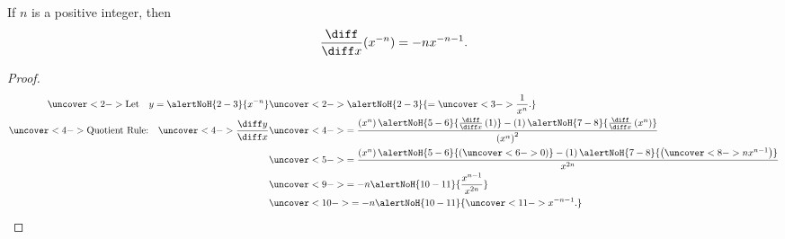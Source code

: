 \begin{frame}[t]
\begin{theorem}
If $n$ is a positive integer, then %
\[
\frac{\diff}{\diff x}(x^{-n}) = -nx^{-n-1}.
\]
\end{theorem}
\begin{proof}
\abovedisplayskip=0pt
\belowdisplayskip=-15pt
\abovedisplayshortskip=0pt
\belowdisplayshortskip=0pt
\begin{align*}
\uncover<2->{%
\text{Let}\quad y = \alertNoH{ 2-3}{x^{-n}} %
}%
& \uncover<2->{\alertNoH{ 2-3}{ = \uncover<3->{\frac{1}{x^n}.}}%
}\\%
\uncover<4->{%
\text{Quotient Rule:}\quad%
}%
\uncover<4->{%
\frac{\diff y}{\diff x}%
}%
& \uncover<4->{%
 = \frac%
{\left( x^{n} \right) \alertNoH{ 5-6}{\frac{\diff}{\diff x}\left( 1 \right)} - \left( 1 \right) \alertNoH{ 7-8}{\frac{\diff}{\diff x}\left( x^n \right)}}%
{\left( x^n\right)^2}%
}\\%
& \uncover<5->{%
 = \frac%
{\left( x^n \right) \alertNoH{ 5-6}{\left(\uncover<6->{ 0 }\right)} - \left( 1 \right) \alertNoH{ 7-8}{\left( \uncover<8->{nx^{n-1}} \right)}}%
{ x^{2n}}%
}\\%
& \uncover<9->{%
 = -n\alertNoH{ 10-11}{\frac{x^{n-1}}{x^{2n}}}%
}\\%
& \uncover<10->{%
 = -n\alertNoH{ 10-11}{\uncover<11->{x^{-n-1}.}}%
}%
\end{align*}
\end{proof}
\end{frame}
